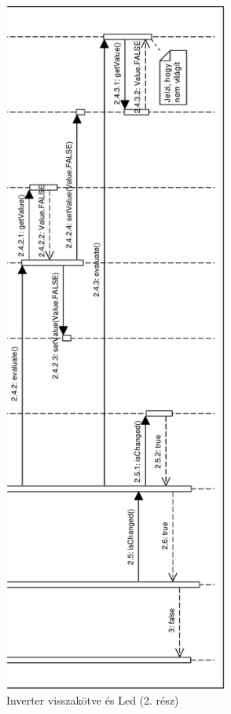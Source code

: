 \begin{figure}[H]
\includegraphics[height=23cm]{chapters/chapter05/imgs/test4-2.pdf}
\caption{Inverter visszakötve és Led (2. rész)}
\label{fig:init}
\end{figure}


